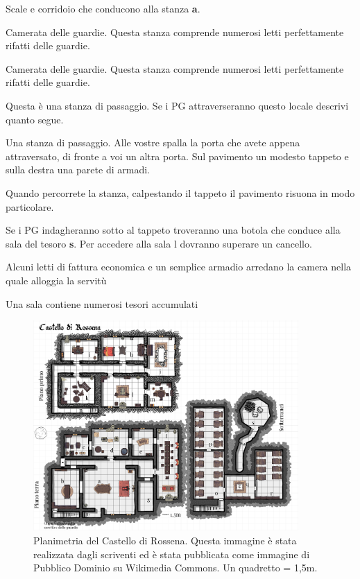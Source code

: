 \documentclass[letterpaper,twocolumn,openany,nodeprecatedcode]{dndbook}
\begin{document}
Scale e corridoio che conducono alla stanza \textbf{a}.

Camerata delle guardie. Questa stanza comprende numerosi letti perfettamente rifatti delle guardie.

Camerata delle guardie. Questa stanza comprende numerosi letti perfettamente rifatti delle guardie.

Questa è una stanza di passaggio. Se i PG attraverseranno questo locale descrivi quanto segue.
\begin{DndReadAloud}
Una stanza di passaggio. Alle vostre spalla la porta che avete appena attraversato, di fronte a voi un altra porta. Sul pavimento un modesto tappeto e sulla destra una parete di armadi.

Quando percorrete la stanza, calpestando il tappeto il pavimento risuona in modo particolare.
\end{DndReadAloud}

Se i PG indagheranno sotto al tappeto troveranno una botola che conduce alla sala del tesoro \textbf{s}. Per accedere alla sala l dovranno superare un cancello.

Alcuni letti di fattura economica e un semplice armadio arredano la camera nella quale alloggia la servitù

Una sala contiene numerosi tesori accumulati

\begin{figure}
\centering
\includegraphics[width=0.9\textwidth]{img/rossena.png}
\caption{Planimetria del Castello di Rossena. Questa immagine è stata realizzata dagli scriventi ed è stata pubblicata come immagine di Pubblico Dominio su Wikimedia Commons. Un quadretto = 1,5m.}
\label{rossena1}
\end{figure}
\end{document}

